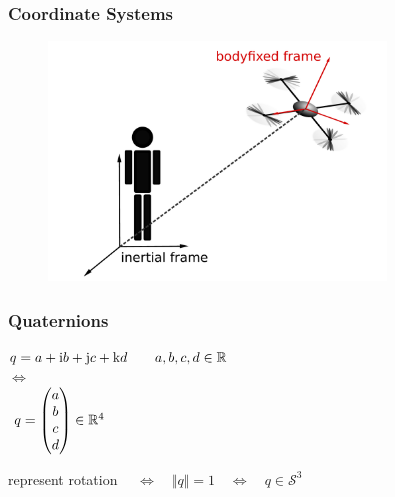\begin{frame}
	\frametitle{Coordinate Systems}
		\begin{figure}[p]
			\centering
			\includegraphics[width=0.8\textwidth]{images/Koordinatensysteme.pdf}
			\label{fig:Koordinatensysteme}
	\end{figure}
\end{frame}


\begin{frame}
	\frametitle{Quaternions}
	\begin{block}{}
		\centering
		\( q = a + \textup{i}b+\textup{j}c+\textup{k}d \qquad a, b, c, d \in \mathbb{R} \) \\
		\vspace{.5ex}
		\(\Leftrightarrow\) \\
		\vspace{1ex}
		\( \hspace{1ex} q = \begin{pmatrix} a \\ b \\ c\\ d \end{pmatrix} \in \mathbb{R}^4 \)
	\end{block}
	
	\vspace{1em}
			 \centering
			represent rotation \( \quad \Leftrightarrow \quad \Vert q \Vert = 1 \quad \Leftrightarrow \quad q \in \mathcal{S}^3\) 
\end{frame}

